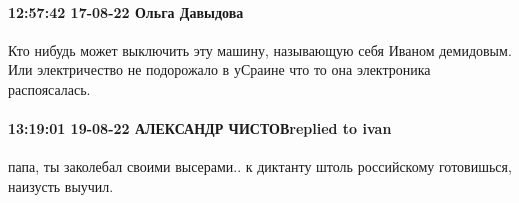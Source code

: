  
 
 
 
 

\paragraph{12:57:42 17-08-22 Ольга Давыдова}

Кто нибудь может выключить эту машину, называющую себя Иваном демидовым. Или
электричество не подорожало в уСраине что то она электроника распоясалась.

\paragraph{13:19:01 19-08-22 АЛЕКСАНДР ЧИСТОВreplied to ivan}

папа, ты заколебал своими высерами.. к диктанту штоль российскому готовишься,
наизусть выучил.
